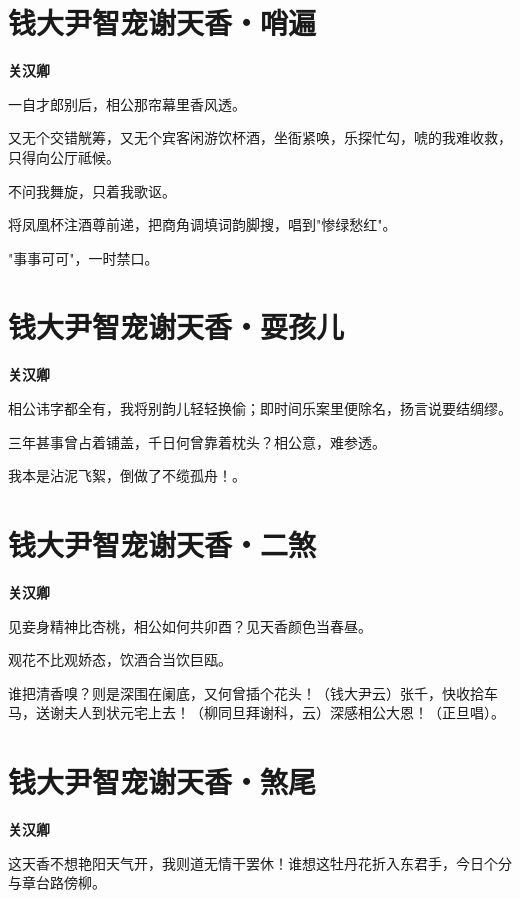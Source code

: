 \documentclass[12pt,a4paper]{ctexbook}
\begin{document}
\section{钱大尹智宠谢天香・哨遍}
\textbf{关汉卿}\par\vspace{0.5em}
一自才郎别后，相公那帘幕里香风透。\par
又无个交错觥筹，又无个宾客闲游饮杯酒，坐衙紧唤，乐探忙勾，唬的我难收救，只得向公厅祗候。\par
不问我舞旋，只着我歌讴。\par
将凤凰杯注酒尊前递，把商角调填词韵脚搜，唱到"惨绿愁红"。\par
"事事可可"，一时禁口。\par

\section{钱大尹智宠谢天香・耍孩儿}
\textbf{关汉卿}\par\vspace{0.5em}
相公讳字都全有，我将别韵儿轻轻换偷；即时间乐案里便除名，扬言说要结绸缪。\par
三年甚事曾占着铺盖，千日何曾靠着枕头？相公意，难参透。\par
我本是沾泥飞絮，倒做了不缆孤舟！。\par

\section{钱大尹智宠谢天香・二煞}
\textbf{关汉卿}\par\vspace{0.5em}
见妾身精神比杏桃，相公如何共卯酉？见天香颜色当春昼。\par
观花不比观娇态，饮酒合当饮巨瓯。\par
谁把清香嗅？则是深围在阑底，又何曾插个花头！（钱大尹云）张千，快收拾车马，送谢夫人到状元宅上去！（柳同旦拜谢科，云）深感相公大恩！（正旦唱）。\par

\section{钱大尹智宠谢天香・煞尾}
\textbf{关汉卿}\par\vspace{0.5em}
这天香不想艳阳天气开，我则道无情干罢休！谁想这牡丹花折入东君手，今日个分与章台路傍柳。\par
\end{document}
